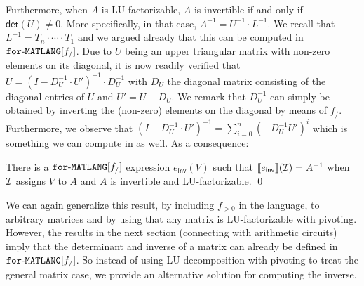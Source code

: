 Furthermore, when $A$ is LU-factorizable, $A$ is invertible if and only if $\mathsf{det}(U)\neq 0$. More specifically,
in that case, $A^{-1}=U^{-1}\cdot L^{-1}$. We recall that $L^{-1}=T_n\cdot\cdots\cdot T_1$ and we argued already that this can be
computed in $\texttt{for}\text{-}\texttt{MATLANG}[f_/]$. Due to $U$ being an upper triangular matrix with non-zero elements on its diagonal, it
is now readily verified that $U=(I-D^{-1}_U\cdot U')^{-1}\cdot D_U^{-1}$ with $D_U$ the diagonal matrix consisting of the diagonal entries of $U$ and $U'=U-D_U$. We remark that $D_U^{-1}$ can simply be obtained by inverting the (non-zero) elements on the diagonal by means of $f_/$. Furthermore, we observe that $(I-D^{-1}_U\cdot U')^{-1}=\sum_{i=0}^{n}(-D_U^{-1}U')^i$ which is something we can compute in \langfor as well. As a consequence:
\begin{proposition}\label{prop:inverse1}
There is a $\texttt{for}\text{-}\texttt{MATLANG}[f_/]$ expression $e_{\mathsf{inv}}(V)$ such that 
$\llbracket e_{\mathsf{inv}} \rrbracket(\mathcal{I})=A^{-1}$ when $\mathcal{I}$ assigns $V$
to $A$ and $A$ is invertible and LU-factorizable.
\qed
\end{proposition}
We can again generalize this result, by including $f_{>0}$ in the language, to arbitrary
matrices and by using that any matrix is LU-factorizable with pivoting. However, the results
in the next section (connecting \langfor with arithmetic circuits) imply that the determinant
and inverse of a matrix can already be defined in $\texttt{for}\text{-}\texttt{MATLANG}[f_/]$. So instead of using LU decomposition with pivoting to treat the general matrix case, we provide an alternative solution
for computing the inverse.

